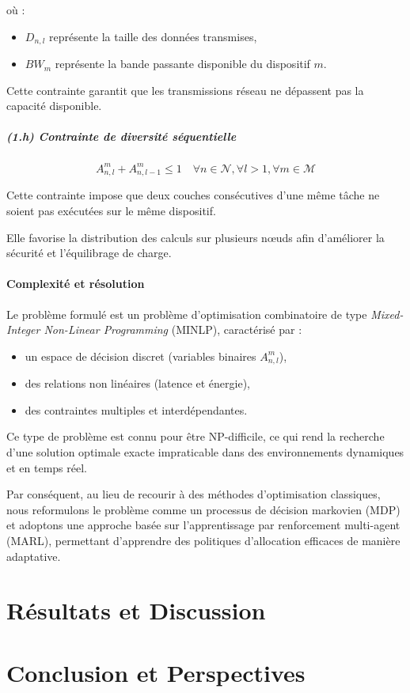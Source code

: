 \documentclass[12pt,a4paper]{report}
\begin{document}
où :
\begin{itemize}
    \item $D_{n,l}$ représente la taille des données transmises,
    \item $BW_m$ représente la bande passante disponible du dispositif $m$.
\end{itemize}

Cette contrainte garantit que les transmissions réseau ne dépassent pas la capacité disponible.

\paragraph{(1.h) Contrainte de diversité séquentielle}

\begin{equation}
A_{n,l}^{m} + A_{n,l-1}^{m} \leq 1
\quad
\forall n \in \mathcal{N},
\forall l > 1,
\forall m \in \mathcal{M}
\end{equation}

Cette contrainte impose que deux couches consécutives d’une même tâche ne soient pas exécutées sur le même dispositif.

Elle favorise la distribution des calculs sur plusieurs nœuds afin d’améliorer la sécurité et l’équilibrage de charge.

\subsubsection{Complexité et résolution}

Le problème formulé est un problème d’optimisation combinatoire de type \textit{Mixed-Integer Non-Linear Programming} (MINLP), caractérisé par :

\begin{itemize}
    \item un espace de décision discret (variables binaires $A_{n,l}^m$),
    \item des relations non linéaires (latence et énergie),
    \item des contraintes multiples et interdépendantes.
\end{itemize}

Ce type de problème est connu pour être NP-difficile, ce qui rend la recherche d’une solution optimale exacte impraticable dans des environnements dynamiques et en temps réel.

Par conséquent, au lieu de recourir à des méthodes d’optimisation classiques, nous reformulons le problème comme un processus de décision markovien (MDP) et adoptons une approche basée sur l’apprentissage par renforcement multi-agent (MARL), permettant d’apprendre des politiques d’allocation efficaces de manière adaptative.

\chapter{Résultats et Discussion}
\chapter{Conclusion et Perspectives}

















\newpage
\printbibliography
\end{document}
